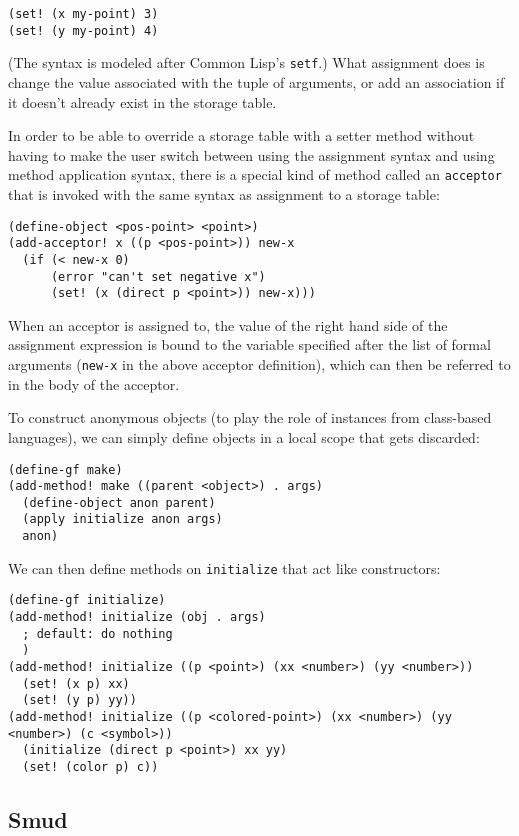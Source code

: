 \documentclass{article}
\begin{document}
\begin{verbatim}
(set! (x my-point) 3)
(set! (y my-point) 4)
\end{verbatim}

(The syntax is modeled after Common Lisp's \texttt{setf}.)  What assignment 
does is change the value associated with the tuple of arguments, or
add an association if it doesn't already exist in the storage table.

In order to be able to override a storage table with a setter method
without having to make the user switch between using the assignment
syntax and using method application syntax, there is a special kind of
method called an \texttt{acceptor} that is invoked with the same
syntax as assignment to a storage table:

\begin{verbatim}
(define-object <pos-point> <point>)
(add-acceptor! x ((p <pos-point>)) new-x
  (if (< new-x 0)
      (error "can't set negative x")
      (set! (x (direct p <point>)) new-x)))
\end{verbatim}

When an acceptor is assigned to, the value of the right hand side of
the assignment expression is bound to the variable specified after the
list of formal arguments (\texttt{new-x} in the above acceptor
definition), which can then be referred to in the body of the acceptor.

To construct anonymous objects (to play the role of instances from
class-based languages), we can simply define objects in a
local scope that gets discarded:

\begin{verbatim}
(define-gf make)
(add-method! make ((parent <object>) . args)
  (define-object anon parent)
  (apply initialize anon args)
  anon)
\end{verbatim}

We can then define methods on \texttt{initialize} that act like
constructors:

\begin{verbatim}
(define-gf initialize)
(add-method! initialize (obj . args)
  ; default: do nothing
  )
(add-method! initialize ((p <point>) (xx <number>) (yy <number>))
  (set! (x p) xx)
  (set! (y p) yy))
(add-method! initialize ((p <colored-point>) (xx <number>) (yy <number>) (c <symbol>))
  (initialize (direct p <point>) xx yy)
  (set! (color p) c))
\end{verbatim}

\subsection{Smud}
\end{document}
